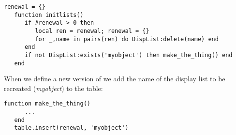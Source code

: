 \begin{Verbatim}[fontsize=\scriptsize,gobble=3]
   renewal = {} 
   function initlists()
      if #renewal > 0 then
         local ren = renewal; renewal = {}
         for _,name in pairs(ren) do DispList:delete(name) end
      end
      if not DispList:exists('myobject') then make_the_thing() end
   end
\end{Verbatim}

When we define a new version of  we add the name of
the display list to be recreated ({\em myobject}) to the  table:

\begin{Verbatim}[fontsize=\scriptsize,gobble=3]
   function make_the_thing()
      ...
   end
   table.insert(renewal, 'myobject')
\end{Verbatim}

